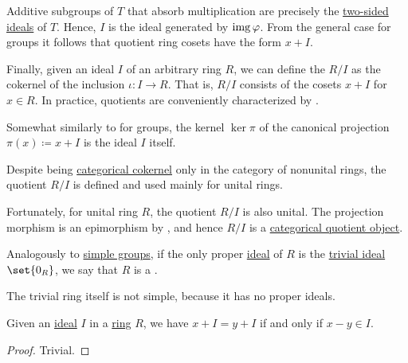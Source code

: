 \begin{definition}
\begin{thmenum}
    Additive subgroups of \( T \) that absorb multiplication are precisely the \hyperref[def:semiring_ideal]{two-sided ideals} of \( T \). Hence, \( I \) is the ideal generated by \( \operatorname{img} \varphi \). From the general case for groups it follows that quotient ring cosets have the form \( x + I \).

    Finally, given an ideal \( I \) of an arbitrary ring \( R \), we can define the  \( R / I \) as the cokernel of the inclusion \( \iota: I \to R \). That is, \( R / I \) consists of the cosets \( x + I \) for \( x \in R \). In practice, quotients are conveniently characterized by .

    Somewhat similarly to  for groups, the kernel \( \ker \pi \) of the canonical projection \( \pi(x) \coloneqq x + I \) is the ideal \( I \) itself.

    Despite being \hyperref[def:zero_morphisms/cokernel]{categorical cokernel} only in the category of nonunital rings, the quotient \( R / I \) is defined and used mainly for unital rings.

    Fortunately, for unital ring \( R \), the quotient \( R / I \) is also unital. The projection morphism is an epimorphism by , and hence \( R / I \) is a \hyperref[def:subobject_and_quotient]{categorical quotient object}.

     Analogously to \hyperref[def:group/simple]{simple groups}, if the only proper \hyperref[def:semiring_ideal]{ideal} of \( R \) is the \hyperref[def:ring/trivial]{trivial ideal} \( \set{ 0_R } \), we say that \( R \) is a .

    The trivial ring itself is not simple, because it has no proper ideals.
  \end{thmenum}
\end{definition}

\begin{proposition}\label{thm:quotient_equality_via_difference}
  Given an \hyperref[def:semiring_ideal]{ideal} \( I \) in a \hyperref[def:ring]{ring} \( R \), we have \( x + I = y + I \) if and only if \( x - y \in I \).
\end{proposition}
\begin{proof}
  Trivial.
\end{proof}

